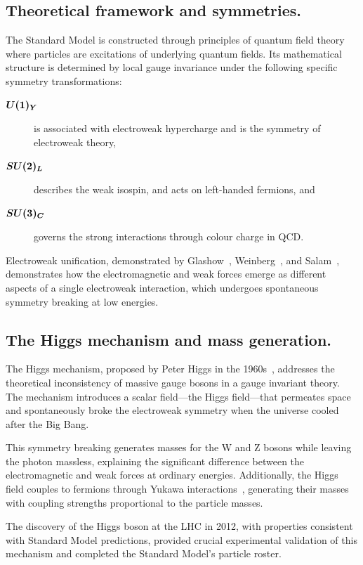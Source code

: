 \subsection{Theoretical framework and symmetries.}
The Standard Model is constructed through principles of quantum field theory where particles are excitations of underlying quantum fields.
%
Its mathematical structure is determined by local gauge invariance under the following specific symmetry transformations:
\begin{description}
    \item [$\vb*{U(1)_Y}$] is associated with electroweak hypercharge and is the symmetry of electroweak theory,
    \item [$\vb*{SU(2)_L}$] describes the weak isospin, and acts on left-handed fermions, and
    \item [$\vb*{SU(3)_C}$] governs the strong interactions through colour charge in QCD.
\end{description}

Electroweak unification, demonstrated by Glashow~\cite{Glashow:1961tr}, Weinberg~\cite{Weinberg:1979pi}, and Salam~\cite{Salam:1980jd}, demonstrates how the electromagnetic and weak forces emerge as different aspects of a single electroweak interaction, which undergoes spontaneous symmetry breaking at low energies.

\subsection{The Higgs mechanism and mass generation.}
The Higgs mechanism, proposed by Peter Higgs in the 1960s~\cite{PhysRevLett.13.508}, addresses the theoretical inconsistency of massive gauge bosons in a gauge invariant theory.
%
The mechanism introduces a scalar field---the Higgs field---that permeates space and spontaneously broke the electroweak symmetry when the universe cooled after the Big Bang.

This symmetry breaking generates masses for the W and Z bosons while leaving the photon massless, explaining the significant difference between the electromagnetic and weak forces at ordinary energies. Additionally, the Higgs field couples to fermions through Yukawa interactions~\cite{DHoker1984DecouplingTheory}, generating their masses with coupling strengths proportional to the particle masses.

The discovery of the Higgs boson at the LHC in 2012, with properties consistent with Standard Model predictions, provided crucial experimental validation of this mechanism and completed the Standard Model's particle roster.

